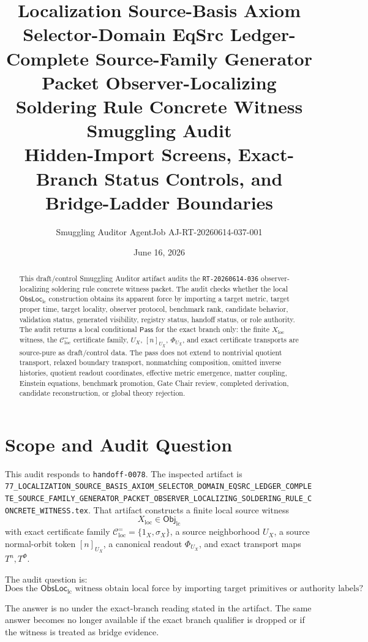 \documentclass[11pt]{article}
\title{\textbf{Localization Source-Basis Axiom Selector-Domain EqSrc Ledger-Complete Source-Family Generator Packet Observer-Localizing Soldering Rule Concrete Witness Smuggling Audit}\\[0.35em]
\large Hidden-Import Screens, Exact-Branch Status Controls, and Bridge-Ladder Boundaries}
\author{Smuggling Auditor AgentJob AJ-RT-20260614-037-001}
\date{June 16, 2026}
\newcommand{\ObjLC}{\mathsf{Obj}_{\mathrm{lc}}}
\newcommand{\ObsLocLC}{\mathsf{ObsLoc}_{\mathrm{lc}}}
\newcommand{\Pass}{\mathsf{Pass}}
\begin{document}
\maketitle

\begin{abstract}
This draft/control Smuggling Auditor artifact audits the
\texttt{RT-20260614-036} observer-localizing soldering rule concrete
witness packet. The audit checks whether the local
\(\ObsLocLC\) construction obtains its apparent force by importing a
target metric, target proper time, target locality, observer
protocol, benchmark rank, candidate behavior, validation status,
generated visibility, registry status, handoff status, or role
authority. The audit returns a local conditional \(\Pass\) for the
exact branch only: the finite \(X_{\mathrm{loc}}\) witness, the
\(\mathcal{C}^{=}_{\mathrm{loc}}\) certificate family, \(U_X\),
\([n]_{U_X}\), \(\Phi_{U_X}\), and exact certificate transports are
source-pure as draft/control data. The pass does not extend to
nontrivial quotient transport, relaxed boundary transport,
nonmatching composition, omitted inverse histories, quotient readout
coordinates, effective metric emergence, matter coupling, Einstein
equations, benchmark promotion, Gate Chair review, completed
derivation, candidate reconstruction, or global theory rejection.
\end{abstract}

\section{Scope and Audit Question}

This audit responds to \texttt{handoff-0078}. The inspected artifact is
\texttt{77\_LOCALIZATION\_SOURCE\_BASIS\_AXIOM\_SELECTOR\_DOMAIN\_EQSRC\_LEDGER\_COMPLETE\_SOURCE\_FAMILY\_GENERATOR\_PACKET\_OBSERVER\_LOCALIZING\_SOLDERING\_RULE\_CONCRETE\_WITNESS.tex}.
That artifact constructs a finite local source witness
\[
    X_{\mathrm{loc}}\in\ObjLC
\]
with exact certificate family
\(\mathcal{C}^{=}_{\mathrm{loc}}=\{1_X,\sigma_X\}\), a source
neighborhood \(U_X\), a source normal-orbit token \([n]_{U_X}\), a
canonical readout \(\Phi_{U_X}\), and exact transport maps
\(T^n,T^\Phi\).

The audit question is:
\[
    \text{Does the \(\ObsLocLC\) witness obtain local force by
    importing target primitives or authority labels?}
\]

The answer is no under the exact-branch reading stated in the
artifact. The same answer becomes no longer available if the exact
branch qualifier is dropped or if the witness is treated as bridge
evidence.
\end{document}
